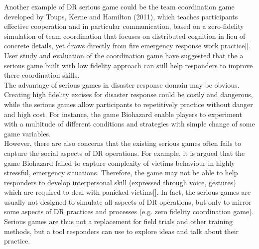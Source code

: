 
Another example of DR serious game could be the team coordination game developed by Toups, Kerne and Hamilton (2011), which teaches participants effective cooperation and in particular communication, based on a zero-fidelity simulation of team coordination that focuses on distributed cognition in lieu of concrete details, yet draws directly from fire emergency response work practice[]. User study and evaluation of the coordination game have suggested that the a serious game built with low fidelity approach can still help responders to improve there coordination skills.\\

The advantage of serious games in disaster response domain may be obvious. Creating high fidelity excises for disaster response could be costly and dangerous, while the serious games allow participants to repetitively practice without danger and high cost. For instance, the game Biohazard enable players to experiment with a multitude of different conditions and strategies with simple change of some game variables.\\

However, there are also concerns that the existing serious games often fails to capture the social aspects of DR operations. For example, it is argued that the game Biohazard failed to capture complexity of victims behaviour in highly stressful, emergency situations. Therefore, the game may not be able to help responders to develop interpersonal skill (expressed through voice, gestures) which are required to deal with panicked victims[]. In fact, the serious games are usually not designed to simulate all aspects of DR operations, but only to mirror some aspects of DR practices and processes (e.g. zero fidelity coordination game). Serious games are thus not a replacement for field trials and other training methods, but a tool responders can use to explore ideas and talk about their practice.\\


